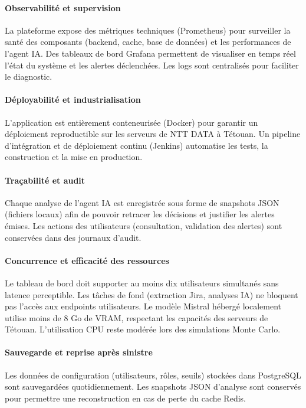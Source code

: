 \paragraph{Observabilité et supervision}
La plateforme expose des métriques techniques (Prometheus) pour surveiller la santé des composants (backend, cache, base de données) et les performances de l’agent IA. Des tableaux de bord Grafana permettent de visualiser en temps réel l’état du système et les alertes déclenchées. Les logs sont centralisés pour faciliter le diagnostic.

\paragraph{Déployabilité et industrialisation}
L’application est entièrement conteneurisée (Docker) pour garantir un déploiement reproductible sur les serveurs de NTT DATA à Tétouan. Un pipeline d’intégration et de déploiement continu (Jenkins) automatise les tests, la construction et la mise en production.

\paragraph{Traçabilité et audit}
Chaque analyse de l’agent IA est enregistrée sous forme de snapshots JSON (fichiers locaux) afin de pouvoir retracer les décisions et justifier les alertes émises. Les actions des utilisateurs (consultation, validation des alertes) sont conservées dans des journaux d’audit.

\paragraph{Concurrence et efficacité des ressources}
Le tableau de bord doit supporter au moins dix utilisateurs simultanés sans latence perceptible. Les tâches de fond (extraction Jira, analyses IA) ne bloquent pas l’accès aux endpoints utilisateurs. Le modèle Mistral hébergé localement utilise moins de 8 Go de VRAM, respectant les capacités des serveurs de Tétouan. L’utilisation CPU reste modérée lors des simulations Monte Carlo.

\paragraph{Sauvegarde et reprise après sinistre}
Les données de configuration (utilisateurs, rôles, seuils) stockées dans PostgreSQL sont sauvegardées quotidiennement. Les snapshots JSON d’analyse sont conservés pour permettre une reconstruction en cas de perte du cache Redis.
